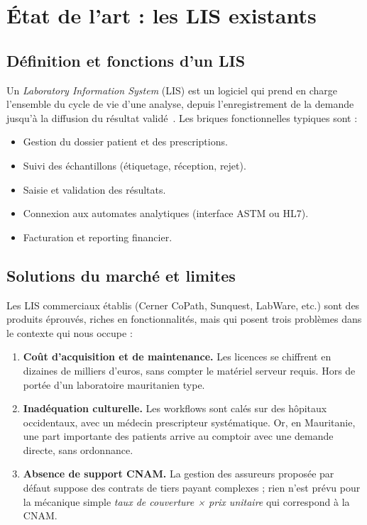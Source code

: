 \documentclass[12pt, a4paper, oneside]{report}
\begin{document}
\section{État de l'art : les LIS existants}

\subsection{Définition et fonctions d'un LIS}
Un \emph{Laboratory Information System} (LIS) est un logiciel qui
prend en charge l'ensemble du cycle de vie d'une analyse, depuis
l'enregistrement de la demande jusqu'à la diffusion du résultat
validé~\cite{tate2014lis}. Les briques fonctionnelles typiques sont :

\begin{itemize}
  \item Gestion du dossier patient et des prescriptions.
  \item Suivi des échantillons (étiquetage, réception, rejet).
  \item Saisie et validation des résultats.
  \item Connexion aux automates analytiques (interface ASTM ou HL7).
  \item Facturation et reporting financier.
\end{itemize}

\subsection{Solutions du marché et limites}
Les LIS commerciaux établis (Cerner CoPath, Sunquest, LabWare, etc.)
sont des produits éprouvés, riches en fonctionnalités, mais qui posent
trois problèmes dans le contexte qui nous occupe :

\begin{enumerate}
  \item \textbf{Coût d'acquisition et de maintenance.} Les licences se
        chiffrent en dizaines de milliers d'euros, sans compter le
        matériel serveur requis. Hors de portée d'un laboratoire
        mauritanien type.
  \item \textbf{Inadéquation culturelle.} Les workflows sont calés sur
        des hôpitaux occidentaux, avec un médecin prescripteur
        systématique. Or, en Mauritanie, une part importante des
        patients arrive au comptoir avec une demande directe, sans
        ordonnance.
  \item \textbf{Absence de support CNAM.} La gestion des assureurs
        proposée par défaut suppose des contrats de tiers payant
        complexes ; rien n'est prévu pour la mécanique simple
        \emph{taux de couverture × prix unitaire} qui correspond à la
        CNAM.
\end{enumerate}
\end{document}
